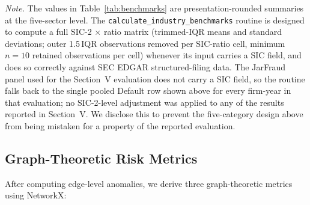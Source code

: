 \documentclass[12pt]{article}
\begin{document}
\begin{table}[tbp]
\centering
\caption{Industry-specific benchmark parameters for $z$-score computation.}
\label{tab:benchmarks}

\medskip
\noindent\textit{Note.} The values in Table~\ref{tab:benchmarks} are
presentation-rounded summaries at the five-sector level.  The
\texttt{calculate\_industry\_benchmarks} routine is designed to compute a
full SIC-2 $\times$ ratio matrix (trimmed-IQR means and standard
deviations; outer 1.5\,IQR observations removed per SIC-ratio cell,
minimum $n=10$ retained observations per cell) whenever its input carries
a SIC field, and does so correctly against SEC EDGAR structured-filing
data.  The JarFraud panel used for the Section~V evaluation does not
carry a SIC field, so the routine falls back to the single pooled Default
row shown above for every firm-year in that evaluation; no SIC-2-level
adjustment was applied to any of the results reported in Section~V.  We
disclose this to prevent the five-category design above from being
mistaken for a property of the reported evaluation.
\end{table}

\subsection*{Graph-Theoretic Risk Metrics}

After computing edge-level anomalies, we derive three graph-theoretic metrics
using NetworkX:
\end{document}
